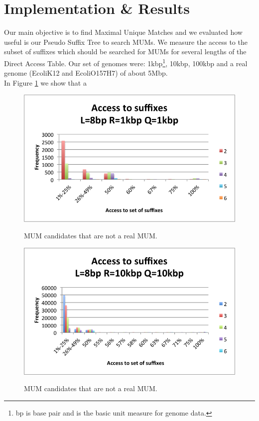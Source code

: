 \documentclass[runningheads,a4paper]{llncs}
\begin{document}
\section{Implementation \& Results}
Our main objective is to find Maximal Unique Matches and we evaluated how useful is our Pseudo Suffix Tree to search MUMs. We measure the access to the subset of suffixes which should be searched for MUMs for several lengths of the Direct Access Table. Our set of genomes were: 1kbp\footnote{bp is base pair and is the basic unit measure for genome data.}, 10kbp, 100kbp and a real genome (EcoliK12 and EcoliO157H7) of about 5Mbp.\\
In Figure \ref{fig:1k} we show that a
\begin{figure}
\centering
\includegraphics[scale=0.5]{1k.png}
\label{fig:1k}
\caption{MUM candidates that are not a real MUM.}
\end{figure}
\begin{figure}
\centering
\includegraphics[scale=0.5]{10k.png}
\label{fig:10k}
\caption{MUM candidates that are not a real MUM.}
\end{figure}
\end{document}

